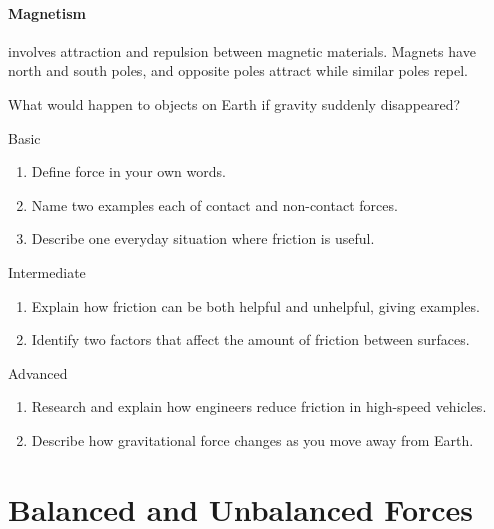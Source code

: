 
\paragraph{Magnetism} involves attraction and repulsion between magnetic materials. Magnets have north and south poles, and opposite poles attract while similar poles repel.

\begin{stopandthink}
What would happen to objects on Earth if gravity suddenly disappeared?
\end{stopandthink}

\begin{tieredquestions}{Basic}
\begin{enumerate}
    \item Define force in your own words.
    \item Name two examples each of contact and non-contact forces.
    \item Describe one everyday situation where friction is useful.
\end{enumerate}
\end{tieredquestions}

\begin{tieredquestions}{Intermediate}
\begin{enumerate}
    \item Explain how friction can be both helpful and unhelpful, giving examples.
    \item Identify two factors that affect the amount of friction between surfaces.
\end{enumerate}
\end{tieredquestions}

\begin{tieredquestions}{Advanced}
\begin{enumerate}
    \item Research and explain how engineers reduce friction in high-speed vehicles.
    \item Describe how gravitational force changes as you move away from Earth.
\end{enumerate}
\end{tieredquestions}

\section{Balanced and Unbalanced Forces}

